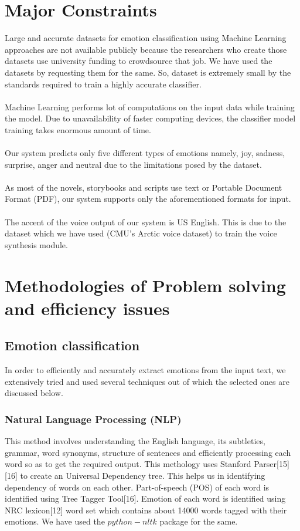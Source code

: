 \documentclass[oneside,a4paper,12pt]{book}
\begin{document}
\section{Major Constraints}
 Large and accurate datasets for emotion classification using Machine Learning approaches are not available publicly because the researchers who create those datasets use university funding to crowdsource that job. We have used the datasets by requesting them for the same. So, dataset is extremely small by the standards required to train a highly accurate classifier.\\\\
 Machine Learning performs lot of computations on the input data while training the model. Due to unavailability of faster computing devices, the classifier model training takes enormous amount of time.\\\\
 Our system predicts only five different types of emotions namely, joy, sadness, surprise, anger and neutral due to the limitations posed by the dataset.\\\\
 As most of the novels, storybooks and scripts use text or Portable Document Format (PDF), our system supports only the aforementioned formats for input.\\\\
 The accent of the voice output of our system is US English. This is due to the dataset which we have used (CMU's Arctic voice dataset) to train the voice synthesis module.
 
\section{Methodologies of Problem solving and efficiency issues}
 \subsection{Emotion classification}
	 In order to efficiently and accurately extract emotions from the input text, we extensively tried and used several techniques out of which the selected ones are discussed below.
	 \subsubsection{Natural Language Processing (NLP)}
	 This method involves understanding the English language, its subtleties, grammar, word synonyms, structure of sentences and efficiently processing each word so as to get the required output. This methology uses Stanford Parser[15][16] to create an Universal Dependency tree. This helps us in identifying dependency of words on each other. Part-of-speech (POS) of each word is identified using Tree Tagger Tool[16]. Emotion of each word is identified using NRC lexicon[12] word set which contains about 14000 words tagged with their emotions. We have used the $python-nltk$ package for the same.
	 
\end{document}
